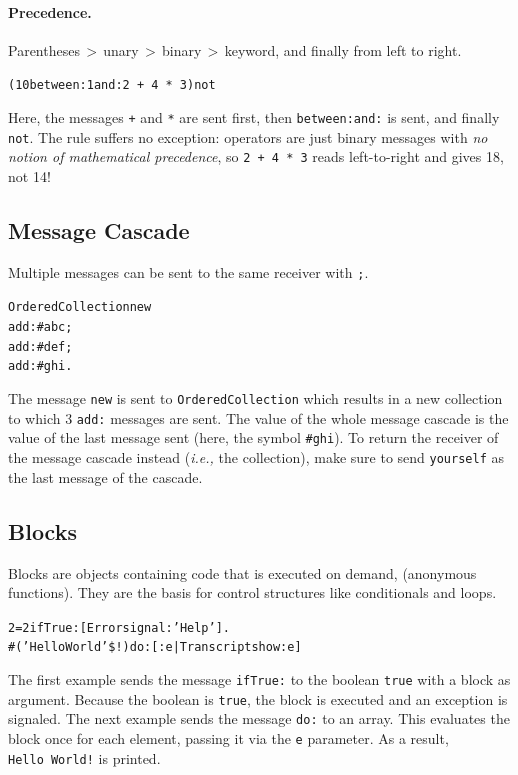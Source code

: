 \documentclass[notumble]{leaflet}
\makeatletter
\newcommand{\ie}{\emph{i.e.,}\xspace}
\newenvironment{displaycode}{%
    \par
    \begin{lrbox}{\code@box}%
        \begin{minipage}{\linewidth}
            \begin{alltt}\small}{
            \end{alltt}
        \end{minipage}
    \end{lrbox}
    \colorbox{light-gray}{\usebox{\code@box}}%
    \par}
\newcommand{\code}[1]{\foreignlanguage{english}{\texttt{#1}}}
\makeatother
\begin{document}
\paragraph{Precedence.}

Parentheses\,$>$\,unary\,$>$\,binary\,$>$\,keyword, and finally from left to right.

\begin{displaycode}
(10 between: 1 and: 2\,+\,4\,*\,3) not
\end{displaycode}

Here, the messages \code{+} and \code{*} are sent first, then \code{between:and:} is sent, and finally \code{not}.
The rule suffers no exception: operators are just binary messages with \emph{no notion of mathematical precedence}, so
\code{2\,+\,4\,*\,3} reads left-to-right and gives 18, not 14!

\subsection{Message Cascade}

Multiple messages can be sent to the same receiver with \code{;}.

\begin{displaycode}
OrderedCollection new
  add: #abc;
  add: #def;
  add: #ghi.
\end{displaycode}

The message \code{new} is sent to \code{OrderedCollection} which
results in a new collection to which 3 \code{add:} messages are sent.
The value of the whole message cascade is the value of the last
message sent (here, the symbol \code{\#ghi}). To return the receiver
of the message cascade instead (\ie the collection), make sure to send
\code{yourself} as the last message of the cascade.

\subsection{Blocks}

Blocks are objects containing code that is executed on demand,
(anonymous functions). They are the basis for control structures like
conditionals and loops.

\begin{displaycode}
2 = 2 ifTrue: [Error signal: 'Help'].
\#('Hello World' \$!) do: [:e | Transcript show: e]
\end{displaycode}
The first example sends the message \code{ifTrue:} to the boolean
\code{true} with a block as argument. Because the boolean is
\code{true}, the block is executed and an exception is signaled. The
next example sends the message \code{do:} to an array. This evaluates
the block once for each element, passing it via the \code{e}
parameter. As a result, \code{Hello~World!} is printed.
\end{document}
